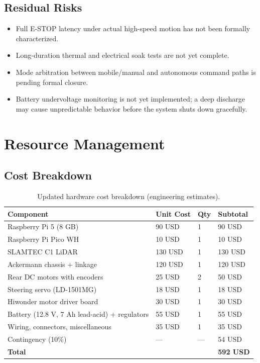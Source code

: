 \documentclass[12pt,a4paper]{report}
\begin{document}
\section{Residual Risks}

\begin{itemize}
    \item Full E-STOP latency under actual high-speed motion has not been formally characterized.
    \item Long-duration thermal and electrical soak tests are not yet complete.
    \item Mode arbitration between mobile/manual and autonomous command paths is pending formal closure.
    \item Battery undervoltage monitoring is not yet implemented; a deep discharge may cause unpredictable behavior before the system shuts down gracefully.
\end{itemize}

\chapter{Resource Management}

\section{Cost Breakdown}

\begin{table}[H]
\centering
\caption{Updated hardware cost breakdown (engineering estimates).}
\label{tab:cost}
\begin{tabularx}{\textwidth}{|X|p{2cm}|p{1.5cm}|p{2.2cm}|}
\hline
\textbf{Component} & \textbf{Unit Cost} & \textbf{Qty} & \textbf{Subtotal} \\
\hline
Raspberry Pi 5 (8 GB) & 90 USD & 1 & 90 USD \\
\hline
Raspberry Pi Pico WH & 10 USD & 1 & 10 USD \\
\hline
SLAMTEC C1 LiDAR & 130 USD & 1 & 130 USD \\
\hline
Ackermann chassis + linkage & 120 USD & 1 & 120 USD \\
\hline
Rear DC motors with encoders & 25 USD & 2 & 50 USD \\
\hline
Steering servo (LD-1501MG) & 18 USD & 1 & 18 USD \\
\hline
Hiwonder motor driver board & 30 USD & 1 & 30 USD \\
\hline
Battery (12.8 V, 7 Ah lead-acid) + regulators & 55 USD & 1 & 55 USD \\
\hline
Wiring, connectors, miscellaneous & 35 USD & 1 & 35 USD \\
\hline
Contingency (10\%) & --- & --- & 54 USD \\
\hline
\textbf{Total} & & & \textbf{592 USD} \\
\hline
\end{tabularx}
\end{table}
\end{document}
